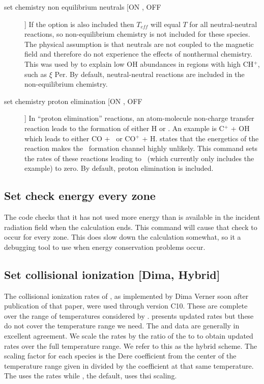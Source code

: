 \begin{description}
\item[set chemistry non equilibrium neutrals [ON , OFF]]    If the option
 is also included then $T_{eff}$ will equal $T$ for all neutral-neutral
reactions, so non-equilibrium chemistry is not included for these species.
The physical assumption is that neutrals are not coupled to the magnetic
field and therefore do not experience the effects of nonthermal chemistry.
This was used by \citet{Federman1996} to explain low OH abundances in
regions with high CH$^+$, such as $\xi$ Per.
By default, neutral-neutral reactions
are included in the non-equilibrium chemistry.

\item[set chemistry proton elimination  [ON , OFF]]  In ``proton elimination''
reactions, an atom-molecule non-charge transfer reaction leads to the
formation of either H or \hplus.
An example is C$^+$ + OH which leads to either
CO + \hplus\ or CO$^+$ + H.  \citet{Huntress1977} states that the energetics of the
reaction makes the \hplus\ formation channel highly unlikely.
This command sets
the rates of these reactions leading to \hplus\ (which currently only includes
the example) to zero.
By default, proton elimination is included.
\end{description}

\subsection{Set check energy every zone}
The code checks that it has not used more energy than
is available in the incident radiation field when the calculation ends.
This command will cause that check to occur for every zone. 
This does slow down the calculation somewhat, so it a debugging
tool to use when energy conservation problems occur.

\subsection{Set collisional ionization [Dima, Hybrid]}
The collisional ionization rates of \citet{Voronov1997},
as implemented by Dima Verner soon after publication of that paper, 
were used through version C10.
These are complete over the range of temperatures considered by \Cloudy .
\citet{Dere.K07Ionization-rate-coefficients-for-the-elements} 
presents updated rates but these do not cover the temperature range we need.
The \citet{Voronov1997} and \citet{Dere.K07Ionization-rate-coefficients-for-the-elements} 
data are generally in excellent agreement.
We scale the \citet{Voronov1997} rates by the ratio of the 
\citet{Dere.K07Ionization-rate-coefficients-for-the-elements} to \citet{Voronov1997}
to obtain updated rates over the full temperature range.  
We refer to this as the hybrid scheme.
The scaling factor for each species is the Dere coefficient from the 
center of the temperature range given in 
\citet{Dere.K07Ionization-rate-coefficients-for-the-elements} 
divided by the 
\citet{Voronov1997} coefficient at that same temperature.
The  uses the \citet{Voronov1997} rates
while , the default, uses thsi scaling.

